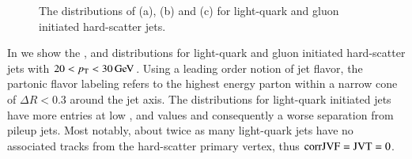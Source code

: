 \documentclass{atlasnote}
\begin{document}
\begin{figure}[!htbp]
  \centering
  \caption{The distributions of \cJVF (a), \RpT (b) and \JVT (c) for light-quark and gluon initiated hard-scatter jets.}
  \label{fig:flavor_dep}
\end{figure}
In  we show the \cJVF, \RpT and \JVT distributions for light-quark and gluon initiated hard-scatter jets with 
$20<p_{\mathrm{T}}<30\,\text{Ge\hspace{-.08em}V}$. Using a leading order notion of jet flavor, the partonic flavor labeling refers to the highest energy parton within a narrow cone
of $\Delta R<0.3$ 
around the jet axis.
The distributions for light-quark initiated
jets have more entries at low \cJVF, \RpT and \JVT values and consequently a worse separation from pileup jets. 
Most notably, about twice as many light-quark jets have no associated tracks 
from the hard-scatter primary vertex, thus ${\rm corrJVF}={\rm JVT}=0$. 
\end{document}

